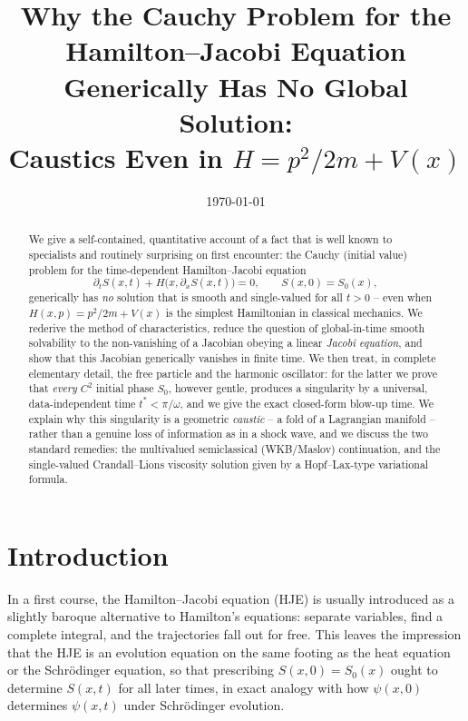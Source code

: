 \documentclass[11pt]{article}
\title{Why the Cauchy Problem for the Hamilton--Jacobi Equation\\
Generically Has No Global Solution:\\
Caustics Even in $H=p^2/2m+V(x)$}
\author{}
\date{\today}
\theoremstyle{plain}
\theoremstyle{definition}
\theoremstyle{remark}
\begin{document}
\maketitle

\begin{abstract}
\noindent
We give a self-contained, quantitative account of a fact that is well known to
specialists and routinely surprising on first encounter: the Cauchy
(initial value) problem for the time-dependent Hamilton--Jacobi equation
\[
\partial_t S(x,t) + H\big(x,\partial_x S(x,t)\big) = 0, \qquad S(x,0) = S_0(x),
\]
generically has \emph{no} solution that is smooth and single-valued for all
$t>0$ -- even when $H(x,p) = p^2/2m + V(x)$ is the simplest Hamiltonian in
classical mechanics. We rederive the method of characteristics, reduce the
question of global-in-time smooth solvability to the non-vanishing of a
Jacobian obeying a linear \emph{Jacobi equation}, and show that this
Jacobian generically vanishes in finite time. We then treat, in complete
elementary detail, the free particle and the harmonic oscillator: for the
latter we prove that \emph{every} $C^2$ initial phase $S_0$, however
gentle, produces a singularity by a universal, data-independent time
$t^\ast < \pi/\omega$, and we give the exact closed-form blow-up time. We
explain why this singularity is a geometric \emph{caustic} -- a fold of a
Lagrangian manifold -- rather than a genuine loss of information as in a
shock wave, and we discuss the two standard remedies: the multivalued
semiclassical (WKB/Maslov) continuation, and the single-valued
Crandall--Lions viscosity solution given by a Hopf--Lax-type variational
formula.
\end{abstract}

\tableofcontents

\section{Introduction}

In a first course, the Hamilton--Jacobi equation (HJE) is usually introduced as
a slightly baroque alternative to Hamilton's equations: separate variables,
find a complete integral, and the trajectories fall out for free. This leaves
the impression that the HJE is an evolution equation on the same footing as the
heat equation or the Schr\"odinger equation, so that prescribing
$S(x,0)=S_0(x)$ ought to determine $S(x,t)$ for all later times, in exact
analogy with how $\psi(x,0)$ determines $\psi(x,t)$ under Schr\"odinger
evolution.
\end{document}
